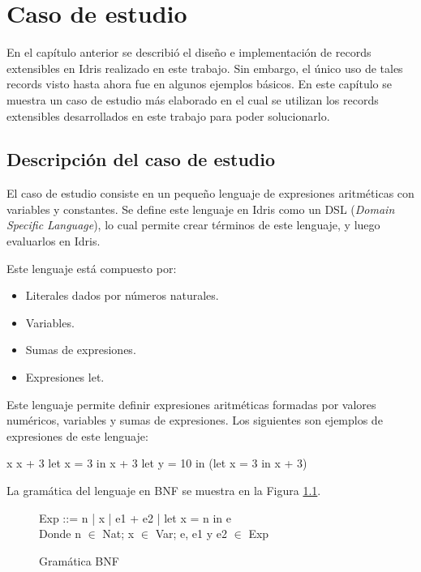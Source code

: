 
\chapter{Caso de estudio}
\label{ch:4}

En el capítulo anterior se describió el diseño e implementación de records extensibles en Idris realizado en este trabajo. Sin embargo, el único uso de tales records visto hasta ahora fue en algunos ejemplos básicos. En este capítulo se muestra un caso de estudio más elaborado en el cual se utilizan los records extensibles desarrollados en este trabajo para poder solucionarlo.

\section{Descripción del caso de estudio}

El caso de estudio consiste en un pequeño lenguaje de expresiones aritméticas con variables y constantes. Se define este lenguaje en Idris como un DSL (\textit{Domain Specific Language}), lo cual permite crear términos de este lenguaje, y luego evaluarlos en Idris.

Este lenguaje está compuesto por:

\begin{itemize}
\item Literales dados por números naturales.
\item Variables.
\item Sumas de expresiones.
\item Expresiones let.
\end{itemize}

Este lenguaje permite definir expresiones aritméticas formadas por valores numéricos, variables y sumas de expresiones. Los siguientes son ejemplos de expresiones de este lenguaje:

\begin{code}
x
x + 3
let x = 3 in x + 3
let y = 10 in (let x = 3 in x + 3)
\end{code}

La gramática del lenguaje en BNF se muestra en la Figura \ref{fig:RulesBNF}.

\begin{figure}[h]

\centering
Exp ::= n | x | e1 + e2 | let x = n in e\\

Donde n $\in$ Nat; x $\in$ Var; e, e1 y e2 $\in$ Exp
\caption{Gramática BNF}
\label{fig:RulesBNF}
\end{figure}



